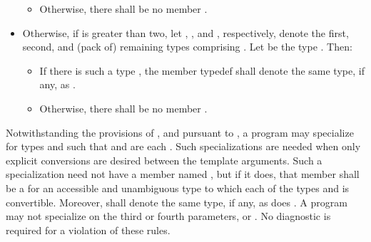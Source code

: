 \begin{addedblock}
\begin{itemize}
\begin{itemize}
  \item Otherwise, there shall be no member .
  \end{itemize}

\item Otherwise, if  is greater than two, let ,
  , and , respectively, denote the first, second, and
  (pack of) remaining types comprising . Let  be the type
  . Then:
  \begin{itemize}
  \item If there is such a type , the member typedef  shall
    denote the same type, if any, as .

  \item Otherwise, there shall be no member .
  \end{itemize}
\end{itemize}

\pnum
Notwithstanding the provisions of , and
pursuant to ,
a program may specialize 
for types  and  such that
 and
 are each .
\enternote Such specializations are needed when only explicit conversions
are desired between the template arguments. \exitnote
Such a specialization need not have a member named ,
but if it does, that member shall be a 
for an accessible and unambiguous type 
to which each of the types  and  is convertible.
Moreover,  shall denote
the same type, if any, as does .
A program may not specialize  on the third or
fourth parameters,  or . No diagnostic is required for
a violation of these rules.
\end{addedblock}
